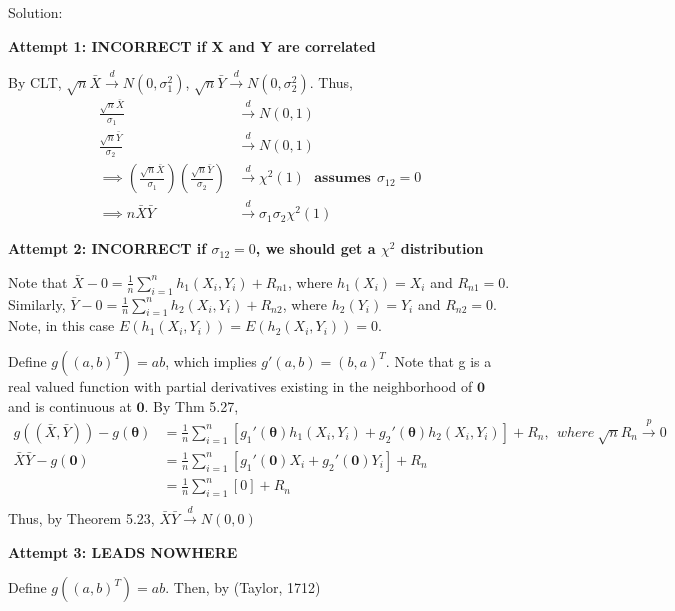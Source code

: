 \documentclass[
  letterpaper,
  DIV=11,
  numbers=noendperiod]{scrreprt}
\begin{document}
Solution:

\textbf{Attempt 1: INCORRECT if X and Y are correlated}

By CLT, \(\sqrt n \bar X \overset d \to N(0,\sigma_1^2)\),
\(\sqrt n \bar Y \overset d \to N(0,\sigma_2^2)\). Thus,
\[\begin{aligned}\frac{\sqrt n \bar X}{\sigma_1} &\overset d \to N(0,1)\\
\frac{\sqrt n \bar Y}{\sigma_2} &\overset d \to N(0,1)\\
\implies \left(\frac{\sqrt n \bar X}{\sigma_1} \right)\left(\frac{\sqrt n \bar Y}{\sigma_2} \right) &\overset d \to \chi^2(1) ~~~ \mathbf{assumes}~~ \sigma_{12}=0\\
\implies n \bar X \bar Y &\overset d \to \sigma_1\sigma_2\chi^2(1)
\end{aligned} \]

\textbf{Attempt 2: INCORRECT if \(\sigma_{12} =0\), we should get a
\(\chi^2\) distribution}

Note that \(\bar X -0= \frac{1}{n} \sum_{i=1}^n h_1(X_i,Y_i) + R_{n1}\),
where \(h_1(X_i) = X_i\) and \(R_{n1} = 0\). Similarly,
\(\bar Y - 0 = \frac{1}{n} \sum_{i=1}^n h_2(X_i,Y_i) + R_{n2}\), where
\(h_2(Y_i) = Y_i\) and \(R_{n2} = 0\). Note, in this case
\(E(h_1(X_i,Y_i)) =E(h_2(X_i,Y_i)) =0\).

Define \(g((a,b)^T) = ab\), which implies \(g'(a,b) = (b,a)^T\). Note
that g is a real valued function with partial derivatives existing in
the neighborhood of \(\mathbf 0\) and is continuous at \(\mathbf 0\). By
Thm 5.27, \[\begin{aligned}
g((\bar X, \bar Y)) -g(\boldsymbol{\theta}) &= \frac{1}{n} \sum_{i=1}^n \left[g_1' (\boldsymbol \theta)h_1(X_i,Y_i)+g_2'(\boldsymbol \theta)h_2(X_i,Y_i)\right] + R_n, ~~where~\sqrt n R_n \overset p \to 0 \\
\bar X \bar Y -g(\mathbf 0) &= \frac{1}{n} \sum_{i=1}^n \left[g_1' (\mathbf 0)X_i+g_2'(\mathbf 0)Y_i\right] + R_n \\
&= \frac{1}{n} \sum_{i=1}^n [0] + R_n \\
\end{aligned}\] Thus, by Theorem 5.23,
\(\bar X \bar Y \overset d \to N(0,0)\)

\textbf{Attempt 3: LEADS NOWHERE}

Define \(g((a,b)^T) = ab\). Then, by (Taylor, 1712)
\end{document}
